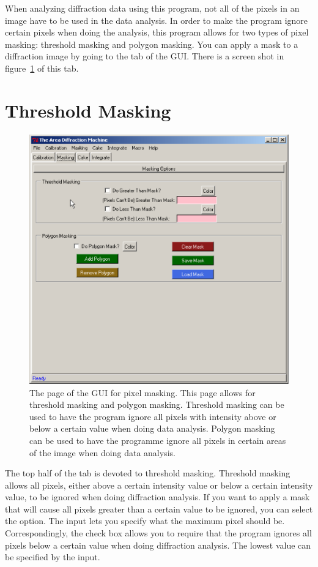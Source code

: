 
When analyzing diffraction data using this program,
not all of the pixels in an image have to be used in
the data analysis. In order to make the program
ignore certain pixels when doing the analysis, this
program allows for two types of pixel masking:
threshold masking and polygon masking. You can apply
a mask to a diffraction image by going to the
 tab of the GUI. There is a screen
shot in figure~\ref{masking_page} of this tab.


\section{Threshold Masking}

\begin{figure}
\centering
\includegraphics[scale=.75]{figures/masking_page.eps}
\caption{The page of the GUI for pixel masking. This 
page allows for threshold masking and polygon masking. 
Threshold masking can be used to have the program 
ignore all pixels with intensity above or below
a certain value when doing data analysis. 
Polygon masking can be used to have the programme
ignore all pixels in certain areas of the image
when doing data analysis.} 
\label{masking_page}
\end{figure}

The top half of the  tab is devoted to 
threshold masking. Threshold masking allows all pixels, 
either above a certain intensity value or below a certain 
intensity value, to be ignored when doing diffraction 
analysis. If you want to apply a mask that will cause 
all pixels greater than a certain value to be ignored,
you can select the  option.
The  input 
lets you specify what the maximum pixel should be.
Correspondingly, the  check box
allows you to require that the program ignores all
pixels below a certain value when doing diffraction
analysis. The lowest value can be specified by the 
 input. 

